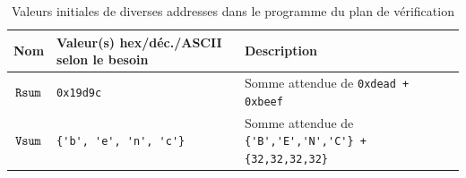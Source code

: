 \documentclass[a11paper]{article}
\newcommand{\vtt}[1]{%
  \text{\normalfont\ttfamily\detokenize{#1}}%
}
\begin{document}
\begin{appendices}
\begin{table}[H]
	\centering
	\footnotesize
	\caption{Valeurs initiales de diverses addresses dans le programme du plan de vérification}
	\label{tab:vars}
	\begin{tabular}{@{}cp{5.5cm}l@{}}
		\toprule
    \textbf{Nom} &
    \textbf{Valeur(s)} hex/déc./ASCII selon le besoin &
    \textbf{Description} \\
		\midrule

    $\vtt{Rsum}$ & \verb|0x19d9c|              & Somme attendue de \verb|0xdead + 0xbeef| \\
    $\vtt{Vsum}$ & \verb|{'b', 'e', 'n', 'c'}| & Somme attendue de \verb|{'B','E','N','C'} + {32,32,32,32}| \\

		\bottomrule
	\end{tabular}
\end{table}

\end{appendices}
\end{document}
